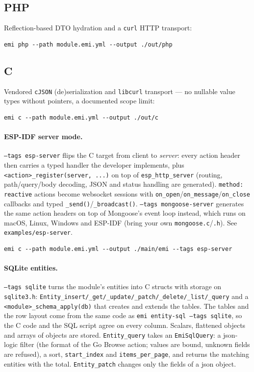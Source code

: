 \subsection{PHP}
Reflection-based DTO hydration and a \texttt{curl} HTTP transport:
\begin{lstlisting}
emi php --path module.emi.yml --output ./out/php
\end{lstlisting}

\subsection{C}
Vendored \texttt{cJSON} (de)serialization and \texttt{libcurl} transport
--- no nullable value types without pointers, a documented scope limit:
\begin{lstlisting}
emi c --path module.emi.yml --output ./out/c
\end{lstlisting}

\paragraph{ESP-IDF server mode.} \texttt{--tags esp-server} flips the C target from
client to \emph{server}: every action header then carries a typed handler
the developer implements, plus \texttt{<action>\_register(server, ...)} on top of
\texttt{esp\_http\_server} (routing, path/query/body decoding, JSON and status
handling are generated). \texttt{method: reactive} actions become websocket
sessions with \texttt{on\_open}/\texttt{on\_message}/\texttt{on\_close} callbacks and
typed \texttt{\_send()}/\texttt{\_broadcast()}. \texttt{--tags mongoose-server} generates the
same action headers on top of Mongoose's event loop instead, which runs on
macOS, Linux, Windows and ESP-IDF (bring your own \texttt{mongoose.c}/\texttt{.h}).
See \texttt{examples/esp-server}.
\begin{lstlisting}
emi c --path module.emi.yml --output ./main/emi --tags esp-server
\end{lstlisting}

\paragraph{SQLite entities.} \texttt{--tags sqlite} turns the module's entities into C structs with
storage on \texttt{sqlite3.h}: \texttt{Entity\_insert/\_get/\_update/\_patch/\_delete/\_list/\_query} and a
\texttt{<module>\_schema\_apply(db)} that creates and extends the tables. The tables and the
row layout come from the same code as \texttt{emi entity-sql --tags sqlite}, so the C code and the
SQL script agree on every column. Scalars, flattened objects and arrays of objects are stored.
\texttt{Entity\_query} takes an \texttt{EmiSqlQuery}: a json-logic filter (the format of the Go Browse
action; values are bound, unknown fields are refused), a sort, \texttt{start\_index} and
\texttt{items\_per\_page}, and returns the matching entities with the total. \texttt{Entity\_patch}
changes only the fields of a json object.


